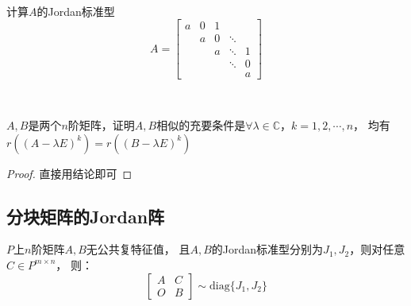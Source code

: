 ~

\begin{exercise}[上述定理的应用]
  计算$A$的Jordan标准型
  \begin{equation*}
    A = \left[
      \begin{array}{ccccc}
        a&0&1&& \\
         &a&0&\ddots& \\
         &&a&\ddots&1 \\
         &&&\ddots&0 \\
         &&&&a
      \end{array}
    \right]
  \end{equation*}
\end{exercise}

~

\begin{exercise}
  $A,B$是两个$n$阶矩阵，证明$A,B$相似的充要条件是$\forall \lambda \in \mathbb{C}$，$k = 1,2,\cdots,n$，
  均有$r((A - \lambda E)^k) = r((B - \lambda E)^k)$
\end{exercise}

\begin{proof}
  直接用结论即可
\end{proof}

\subsection{分块矩阵的Jordan阵}

\begin{theorem}[分块矩阵的Jordan标准型]
  $P$上$n$阶矩阵$A,B$无公共复特征值，
  且$A,B$的Jordan标准型分别为$J_1,J_2$，则对任意$C \in P^{m \times n}$，
  则：
  \begin{equation*}
    \left[
      \begin{array}{cc}
        A&C\\
        O&B
      \end{array}
    \right] \sim \text{diag}\{J_1,J_2\}
  \end{equation*}
\end{theorem}


